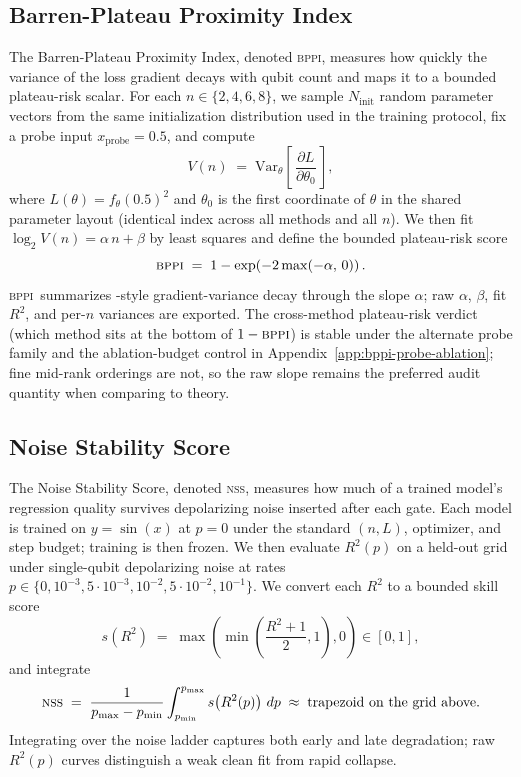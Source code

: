 \documentclass{article}
\newcommand{\bppi}{\textsc{bppi}}
\newcommand{\nss}{\textsc{nss}}
\begin{document}
\subsection{Barren-Plateau Proximity Index}
\label{sec:bppi-definition}

The Barren-Plateau Proximity Index, denoted \bppi, measures how quickly the variance of the loss gradient decays with qubit count and maps it to a bounded plateau-risk scalar.
For each $n \in \{2, 4, 6, 8\}$, we sample $N_{\mathrm{init}}$ random parameter vectors from the same initialization distribution used in the training protocol, fix a probe input $x_{\mathrm{probe}} = 0.5$, and compute
\begin{equation}
    V(n) \;=\; \mathrm{Var}_{\theta}\left[\,\frac{\partial L}{\partial \theta_0}\,\right],
    \label{eq:bppi-variance}
\end{equation}
where $L(\theta) = f_\theta(0.5)^2$ and $\theta_0$ is the first coordinate of $\theta$ in the shared parameter layout (identical index across all methods and all $n$).
We then fit $\log_2 V(n) = \alpha\, n + \beta$ by least squares and define the bounded plateau-risk score
\begin{equation}
    \bppi \;=\; 1 - \exp\!\left(-2 \max(-\alpha,\, 0)\right).
    \label{eq:bppi-formula}
\end{equation}
\bppi\ summarizes \citet{mcclean2018barren}-style gradient-variance decay through the slope $\alpha$; raw $\alpha$, $\beta$, fit $R^2$, and per-$n$ variances are exported.
The cross-method plateau-risk verdict (which method sits at the bottom of $1-\bppi$) is stable under the alternate probe family and the ablation-budget control in Appendix~\ref{app:bppi-probe-ablation}; fine mid-rank orderings are not, so the raw slope remains the preferred audit quantity when comparing to theory.

\subsection{Noise Stability Score}
\label{sec:nss-definition}

The Noise Stability Score, denoted \nss, measures how much of a trained model's regression quality survives depolarizing noise inserted after each gate.
Each model is trained on $y=\sin(x)$ at $p=0$ under the standard $(n,L)$, optimizer, and step budget; training is then frozen.
We then evaluate $R^2(p)$ on a held-out grid under single-qubit depolarizing noise at rates $p \in \{0, 10^{-3}, 5 \cdot 10^{-3}, 10^{-2}, 5 \cdot 10^{-2}, 10^{-1}\}$.
We convert each $R^2$ to a bounded skill score
\begin{equation}
    s(R^2) \;=\; \max\!\left(\min\!\left(\frac{R^2 + 1}{2}, 1\right), 0\right) \in [0, 1],
\end{equation}
and integrate
\begin{equation}
    \nss
    \;=\;
    \frac{1}{p_{\max} - p_{\min}}
    \int_{p_{\min}}^{p_{\max}} s\!\left(R^2(p)\right) \, dp
    \;\approx\;
    \text{trapezoid on the grid above}.
    \label{eq:nss-formula}
\end{equation}
Integrating over the noise ladder captures both early and late degradation; raw $R^2(p)$ curves distinguish a weak clean fit from rapid collapse.
\end{document}

